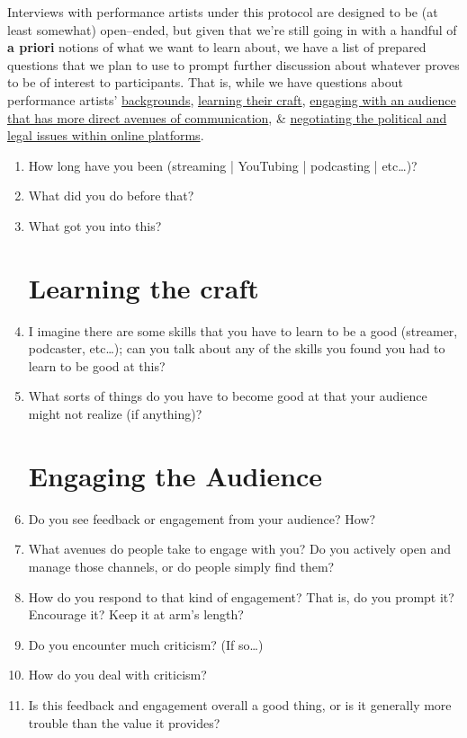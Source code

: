 \documentclass[11pt]{article}
\begin{document}
Interviews with performance artists under this protocol are designed to be
(at least somewhat)
open--ended, but given that we're still going in with a handful of
\textbf{a priori} notions of what we want to learn about,
we have a list of prepared questions that we plan to use to prompt
further discussion about whatever proves to be of interest to participants.
That is, while we have questions about performance artists'
\hyperref[sec:Background]{backgrounds},
\hyperref[sec:LearningCraft]{learning their craft},
\hyperref[sec:EngagingAudience]{engaging with an audience that has more direct avenues of communication},
\&
\hyperref[sec:DealingWithLaw]{negotiating the political and legal issues within online platforms}.

\begin{enumerate}

  \section*{Background}
            \label{sec:Background}
    \item How long have you been (streaming | YouTubing | podcasting | etc\dots)?
    \item What did you do before that?
    \item What got you into this?

  \section*{Learning the craft}
            \label{sec:LearningCraft}
    \item I imagine there are some skills that you have to learn to be a good
          (streamer, podcaster, etc\dots); can you talk about any of the skills
          you found you had to learn to be good at this?
    \item What sorts of things do you have to become good at
          that your audience might not realize (if anything)?
  
  \section*{Engaging the Audience}
            \label{sec:EngagingAudience}
    \item Do you see feedback or engagement from your audience?
          How?
    \item What avenues do people take to engage with you?
          Do you actively open and manage those channels, or
          do people simply find them?
    \item How do you respond to that kind of engagement?
          That is,
            do you prompt it?
            Encourage it?
            Keep it at arm's length?
    \item Do you encounter much criticism?
          (If so\dots)
    \item How do you deal with criticism?
    \item Is this feedback and engagement overall a good thing, or
          is it generally more trouble than the value it provides?
  

\end{enumerate}
\end{document}
